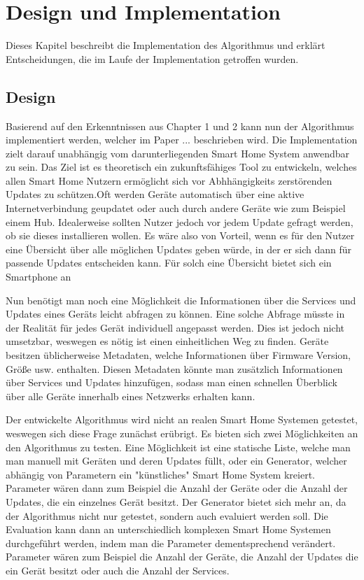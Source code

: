 \chapter{Design und Implementation}\label{ch:eval}

Dieses Kapitel beschreibt die Implementation des Algorithmus und erklärt Entscheidungen, die im
Laufe der Implementation getroffen wurden.

\section{Design}

Basierend auf den Erkenntnissen aus Chapter 1 und 2 kann nun der Algorithmus implementiert 
werden, welcher im Paper ... beschrieben wird. Die Implementation zielt darauf unabhängig vom 
darunterliegenden Smart Home System anwendbar zu sein. Das Ziel ist es theoretisch ein zukunftsfähiges Tool 
zu entwickeln, welches allen Smart Home Nutzern ermöglicht sich vor Abhhängigkeits zerstörenden Updates zu
schützen.Oft werden Geräte automatisch über eine aktive Internetverbindung geupdatet oder auch durch andere
Geräte wie zum Beispiel einem Hub. Idealerweise sollten Nutzer jedoch vor jedem Update gefragt werden, ob sie dieses
installieren wollen. Es wäre also von Vorteil, wenn es für den Nutzer eine Übersicht über alle möglichen Updates geben würde,
in der er sich dann für passende Updates entscheiden kann. Für solch eine Übersicht bietet sich ein Smartphone an






Nun benötigt man noch eine Möglichkeit die Informationen über die Services und Updates eines Geräts leicht abfragen zu können.
Eine solche Abfrage müsste in der Realität für jedes Gerät individuell angepasst werden. Dies ist jedoch nicht umsetzbar,
weswegen es nötig ist einen einheitlichen Weg zu finden. Geräte besitzen üblicherweise Metadaten, welche Informationen über 
Firmware Version, Größe usw. enthalten. Diesen Metadaten könnte man zusätzlich Informationen über Services und Updates 
hinzufügen, sodass man einen schnellen Überblick über alle Geräte innerhalb eines Netzwerks erhalten kann.

Der entwickelte Algorithmus wird nicht an realen Smart Home Systemen getestet, weswegen sich diese Frage 
zunächst erübrigt. Es bieten sich zwei Möglichkeiten an den Algorithmus zu testen. Eine Möglichkeit ist eine statische Liste, welche man 
man manuell mit Geräten und deren Updates füllt, oder ein Generator, welcher abhängig von Parametern ein "künstliches" Smart Home
System kreiert. Parameter wären dann zum Beispiel die Anzahl der Geräte oder die Anzahl der Updates, die ein einzelnes Gerät besitzt.
Der Generator bietet sich mehr an, da der Algorithmus nicht nur getestet, sondern auch evaluiert werden soll.
Die Evaluation kann dann an unterschiedlich komplexen Smart Home Systemen durchgeführt werden, indem man die Parameter 
dementsprechend verändert. Parameter wären zum Beispiel die Anzahl der Geräte, die Anzahl der Updates die ein Gerät besitzt oder 
auch die Anzahl der Services. 






